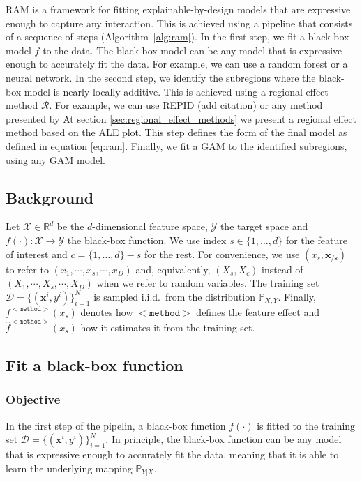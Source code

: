 \documentclass[12pt]{article}
\newcommand{\Rd}{\mathbb{R}^d}
\newcommand{\xb}{\mathbf{x}}
\newcommand{\xcc}{\mathbf{x_{/s}}}
\newcommand{\Xcal}{\mathcal{X}}
\newcommand{\Ycal}{\mathcal{Y}}
\begin{document}
RAM is a framework for fitting explainable-by-design models that are expressive enough to capture any interaction.
This is achieved using a pipeline that consists of a sequence of steps (Algorithm~\ref{alg:ram}).
In the first step, we fit a black-box model \(f\) to the data.
The black-box model can be any model that is expressive enough to accurately fit the data.
For example, we can use a random forest or a neural network.
In the second step, we identify the subregions where the black-box model is nearly locally additive.
This is achieved using a regional effect method \(\mathcal{R}\).
For example, we can use REPID (add citation) or any method presented by %
At section \ref{sec:regional_effect_methods} we present a regional effect method based on the ALE plot.
This step defines the form of the final model as defined in equation \ref{eq:ram}.
Finally, we fit a GAM to the identified subregions, using any GAM model.

\subsection{Background}

Let \(\Xcal \in \Rd\) be the \(d\)-dimensional feature space, \(\Ycal\) the target space and \(f(\cdot) : \Xcal \rightarrow \Ycal\) the black-box function.  We use index \(s \in \{1, \ldots, d\}\) for the feature of interest and \(c = \{1, \ldots, d\} - s\) for the rest.
For convenience, we use \((x_s, \xcc)\) to refer to \((x_1, \cdots , x_s, \cdots, x_D)\) and, equivalently, \((X_s, X_c)\) instead of \((X_1, \cdots , X_s, \cdots, X_D)\) when we refer to random variables.
The training set \(\mathcal{D} = \{(\xb^i, y^i)\}_{i=1}^N\) is sampled
i.i.d.\ from the distribution \(\mathbb{P}_{X,Y}\).  Finally,
\(f^{\mathtt{<method>}}(x_s)\) denotes how \(\mathtt{<method>}\)
defines the feature effect and \(\hat{f}^{\mathtt{<method>}}(x_s)\)
how it estimates it from the training set.

\subsection{Fit a black-box function}

\subsubsection{Objective}

In the first step of the pipelin, a black-box function \(f(\cdot)\) is fitted to the training set \(\mathcal{D} = \{(\xb^i, y^i)\}_{i=1}^N\).
In principle, the black-box function can be any model that is expressive enough to accurately fit the data,
meaning that it is able to learn the underlying mapping \(\mathbb{P}_{Y|X}\).
\end{document}
